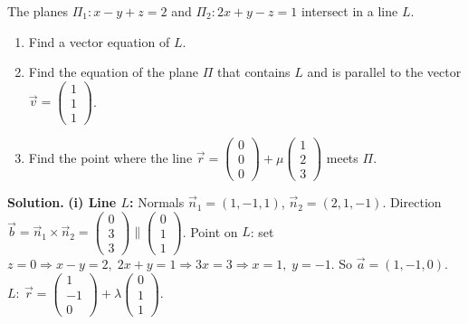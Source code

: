 \documentclass[11pt]{article}
\begin{document}
\begin{exoresolu}
The planes $\Pi_1: x - y + z = 2$ and $\Pi_2: 2x + y - z = 1$ intersect in a line $L$.
\begin{enumerate}
\item Find a vector equation of $L$.
\item Find the equation of the plane $\Pi$ that contains $L$ and is parallel to the vector $\vec{v} = \begin{pmatrix} 1 \\ 1 \\ 1 \end{pmatrix}$.
\item Find the point where the line $\vec{r} = \begin{pmatrix} 0 \\ 0 \\ 0 \end{pmatrix} + \mu\begin{pmatrix} 1 \\ 2 \\ 3 \end{pmatrix}$ meets $\Pi$.
\end{enumerate}
\tcblower
\textbf{Solution.}
\textbf{(i) Line $L$:} Normals $\vec{n}_1 = (1,-1,1)$, $\vec{n}_2 = (2,1,-1)$. Direction $\vec{b} = \vec{n}_1 \times \vec{n}_2 = \begin{pmatrix} 0 \\ 3 \\ 3 \end{pmatrix} \parallel \begin{pmatrix} 0 \\ 1 \\ 1 \end{pmatrix}$.
Point on $L$: set $z=0 \Rightarrow x-y=2,\; 2x+y=1 \Rightarrow 3x=3 \Rightarrow x=1,\; y=-1$. So $\vec{a} = (1,-1,0)$.
$L:\ \vec{r} = \begin{pmatrix} 1 \\ -1 \\ 0 \end{pmatrix} + \lambda\begin{pmatrix} 0 \\ 1 \\ 1 \end{pmatrix}$.


\end{exoresolu}
\end{document}
